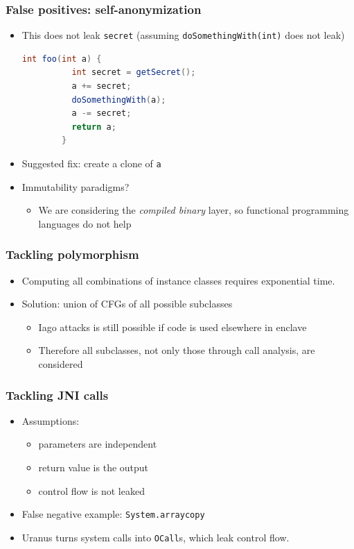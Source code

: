 \documentclass{beamer}
\newcommand{\code}[1]{\colorbox{code}{\texttt{\footnotesize #1}}}
\begin{document}
\begin{frame}[fragile]
  \frametitle{False positives: self-anonymization}
  \begin{itemize}
    \item This does not leak \code{secret}
      (assuming \code{doSomethingWith(int)} does not leak)
      \begin{lstlisting}[style=j, language=java, gobble=6, tabsize=2]
        int foo(int a) {
          int secret = getSecret();
          a += secret;
          doSomethingWith(a);
          a -= secret;
          return a;
        }
      \end{lstlisting}
    \item Suggested fix: create a clone of \code{a}
    \item Immutability paradigms?
      \begin{itemize}
        \item We are considering the \emph{compiled binary} layer,
          so functional programming languages do not help
      \end{itemize}
  \end{itemize}
\end{frame}

\begin{frame}
  \frametitle{Tackling polymorphism}
  \begin{itemize}
    \item Computing all combinations of instance classes requires exponential time.
    \item Solution: union of CFGs of all possible subclasses
      \begin{itemize}
        \item Iago attacks is still possible if code is used elsewhere in enclave
        \item Therefore all subclasses, not only those through call analysis, are considered
      \end{itemize}
  \end{itemize}
\end{frame}

\begin{frame}
  \frametitle{Tackling JNI calls}
  \begin{itemize}
    \item Assumptions:
      \begin{itemize}
        \item parameters are independent
        \item return value is the output
        \item control flow is not leaked
      \end{itemize}
    \item False negative example: \code{System.arraycopy}
    \item Uranus turns system calls into \code{OCall}s,
      which leak control flow.
  \end{itemize}
\end{frame}
\end{document}
